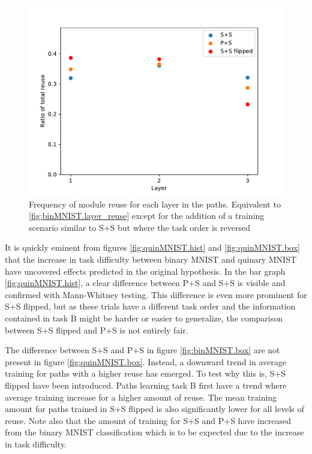 \begin{figure}[t]
    \includegraphics[width=\textwidth]{Chapters/4.Experiments/exp1/figures/QUIN_reuse_by_layer.pdf}
    \caption[Reuse by layer for quinary MNIST classification]{Frequency of module reuse for each layer in the paths. Equivalent to \ref{fig:binMNIST.layer_reuse} except for the addition of a training scenario similar to S+S but where the task order is reversed}
    \label{fig:quinMNIST.layer_reuse}
\end{figure}

It is quickly eminent from figures \ref{fig:quinMNIST.hist} and \ref{fig:quinMNIST.box} that the increase in task difficulty between binary MNIST and quinary MNIST have uncovered effects predicted in the original hypothesis. In the bar graph \ref{fig:quinMNIST.hist}, a clear difference between P+S and S+S is visible and confirmed with Mann-Whitney testing. This difference is even more prominent for S+S flipped, but as these trials have a different task order and the information contained in task B might be harder or easier to generalize, the comparison between S+S flipped and P+S is not entirely fair. 

The difference between S+S and P+S in figure \ref{fig:binMNIST.box} are not present in figure \ref{fig:quinMNIST.box}. Instead, a downward trend in average training for paths with a higher reuse has emerged. To test why this is, S+S flipped have been introduced. Paths learning task B first have a trend where average training increase for a higher amount of reuse. The mean training amount for paths trained in S+S flipped is also significantly lower for all levels of reuse. Note also that the amount of training for S+S and P+S have increased from the binary MNIST classification which is to be expected due to the increase in task difficulty. 

